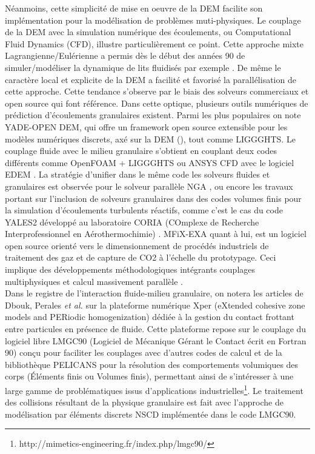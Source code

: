 Néanmoins, cette simplicité de mise en oeuvre de la DEM facilite son implémentation pour la modélisation de problèmes muti-physiques.
Le couplage de la DEM avec la simulation numérique des écoulements, ou Computational Fluid Dynamics (CFD), illustre particulièrement ce point.
Cette approche mixte Lagrangienne/Eulérienne a permis dès le début des années 90 de simuler/modéliser la dynamique de lits fluidisés par exemple \cite{tsuji1992lagrangian,tsuji1993discrete,tsuji2010simultaneous,liu2011simulation,ku2015cfd}. De même le caractère local et explicite de la DEM a facilité et favorisé la parallélisation de cette approche. Cette tendance s'observe par le biais des solveurs commerciaux et open source qui font référence. Dans cette optique, plusieurs outils numériques de prédiction d'écoulements granulaires existent. Parmi les plus populaires on note YADE-OPEN DEM, qui offre un framework open source extensible pour les modèles numériques discrets, axé sur la DEM (\cite{vsmilauer2010yade, kozicki2009yade}), tout comme LIGGGHTS\cite{goniva2010open}. Le couplage fluide avec le milieu granulaire s'obtient en couplant deux codes différents comme OpenFOAM + LIGGGHTS ou ANSYS CFD avec le logiciel EDEM \cite{spogis2008multiphase}. La stratégie d'unifier dans le même code les solveurs fluides et granulaires est observée pour le solveur parallèle NGA \cite{desjardins2008high}, ou encore les travaux portant sur l'inclusion de solveurs granulaires dans des codes volumes finis pour la simulation d'écoulements turbulents réactifs, comme c'est le cas du code YALES2 développé au laboratoire CORIA (COmplexe de Recherche Interprofessionnel en Aérothermochimie) \cite{moureau2011design, dufresne2020massively}. MFiX-EXA \cite{gopalakrishnan2013development} quant à lui, est un logiciel open source orienté vers le dimensionnement de procédés industriels de traitement des gaz et de capture de CO2 à l'échelle du prototypage.
Ceci implique des développements méthodologiques intégrants couplages multiphysiques et calcul massivement parallèle \cite{musser2021mfix}.\\

Dans le registre de l'interaction fluide-milieu granulaire, on notera les articles de Dbouk, Perales \textit{et al.} \cite{dbouk2016df} sur la plateforme numérique Xper (eXtended cohesive zone models and PERiodic homogenization) dédiée à la gestion du contact frottant entre particules en présence de fluide. Cette plateforme repose sur le couplage du logiciel libre LMGC90 (Logiciel de Mécanique Gérant le Contact écrit en Fortran 90) \cite{dubois2013lmgc90} conçu pour faciliter les couplages avec d'autres codes de calcul et de la bibliothèque PELICANS pour la résolution des comportements volumiques des corps (Éléments finis ou Volumes finis), permettant ainsi de s'intéresser à une large gamme de problématiques issus d'applications industrielles\footnote{http://mimetics-engineering.fr/index.php/lmgc90/}. Le traitement des collisions résultant de la physique granulaire est fait avec l'approche de modélisation par éléments discrets NSCD implémentée dans le code LMGC90.\\

